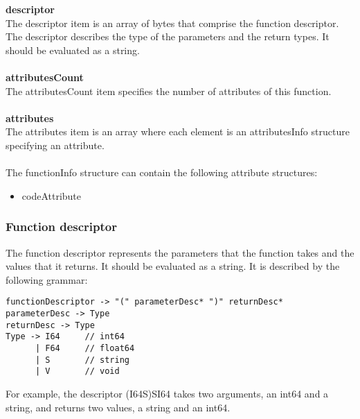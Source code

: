 \documentclass[12pt]{article}
\newcommand*{\formalfont}{\fontfamily{ptm}\selectfont}
\newcommand\tab[1][1cm]{\hspace*{#1}}
\begin{document}
			\textbf{descriptor} \\
				\tab The {\formalfont descriptor} item is an array of bytes that comprise the function descriptor. The descriptor describes the type of the parameters and the return types. It should be evaluated as a string. \\ \\
			\textbf{attributesCount} \\
				\tab The {\formalfont attributesCount} item specifies the number of attributes of this function. \\ \\
			\textbf{attributes} \\
				\tab The {\formalfont attributes} item is an array where each element is an {\formalfont attributesInfo} structure specifying an attribute. \\ \\
				The {\formalfont functionInfo} structure can contain the following attribute structures:
				\begin{itemize}
					\item {\formalfont codeAttribute}
				\end{itemize}
				
			\subsubsection{Function descriptor}
				The function descriptor represents the parameters that the function takes and the values that it returns. It should be evaluated as a string. It is described by the following grammar:
				\begin{Verbatim}[frame=single]
functionDescriptor -> "(" parameterDesc* ")" returnDesc* 
parameterDesc -> Type
returnDesc -> Type
Type -> I64     // int64
      | F64     // float64
      | S       // string
      | V       // void
				\end{Verbatim}
				For example, the descriptor \colorbox{code}{(I64S)SI64} takes two arguments, an int64 and a string, and returns two values, a string and an int64.
				
				
\end{document}
